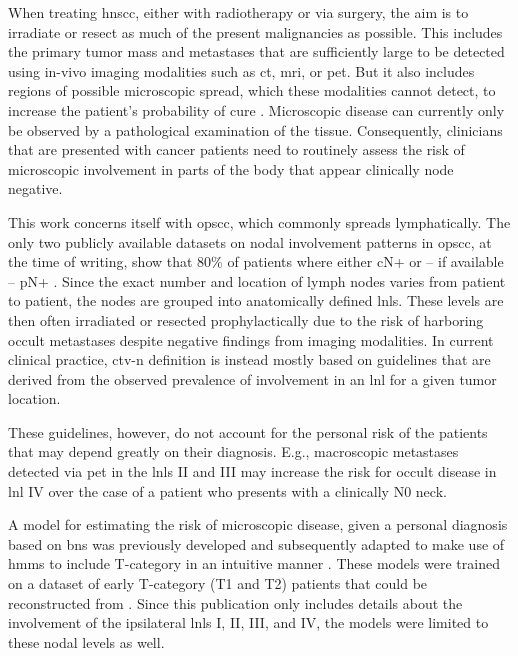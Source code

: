 \documentclass[twocolumn]{aastex631}
\begin{document}
When treating \gls{hnscc}, either with radiotherapy or via surgery, the aim is to irradiate or resect as much of the present malignancies as possible. This includes the primary tumor mass and metastases that are sufficiently large to be detected using in-vivo imaging modalities such as \gls{ct}, \gls{mri}, or \gls{pet}. But it also includes regions of possible microscopic spread, which these modalities cannot detect, to increase the patient's probability of cure \cite{poortmans_internal_2020,murthy_prostate-only_2021}. Microscopic disease can currently only be observed by a pathological examination of the tissue. Consequently, clinicians that are presented with cancer patients need to routinely assess the risk of microscopic involvement in parts of the body that appear clinically node negative.

This work concerns itself with \gls{opscc}, which commonly spreads lymphatically. The only two publicly available datasets on nodal involvement patterns in \gls{opscc}, at the time of writing, show that 80\% of patients where either cN+ or -- if available -- pN+ \cite{ludwig_dataset_2022}. Since the exact number and location of lymph nodes varies from patient to patient, the nodes are grouped into anatomically defined \glspl{lnl}. These levels are then often irradiated or resected prophylactically due to the risk of harboring occult metastases despite negative findings from imaging modalities. In current clinical practice, \gls{ctv-n} definition is instead mostly based on guidelines \cite{gregoire_ct-based_2003,gregoire_delineation_2014,gregoire_delineation_2018,eisbruch_intensity-modulated_2002,biau_selection_2019,chao_determination_2002,vorwerk_guidelines_2011,ferlito_elective_2009} that are derived from the observed prevalence of involvement in an \gls{lnl} for a given tumor location.

These guidelines, however, do not account for the personal risk of the patients that may depend greatly on their diagnosis. E.g., macroscopic metastases detected via \gls{pet} in the \glspl{lnl} II and III may increase the risk for occult disease in \gls{lnl} IV over the case of a patient who presents with a clinically N0 neck.

A model for estimating the risk of microscopic disease, given a personal diagnosis based on \glspl{bn} was previously developed \cite{pouymayou_bayesian_2019} and subsequently adapted to make use of \glspl{hmm} to include T-category in an intuitive manner \cite{ludwig_hidden_2021}. These models were trained on a dataset of early T-category (T1 and T2) patients that could be reconstructed from \cite{sanguineti_defining_2009}. Since this publication only includes details about the involvement of the ipsilateral \glspl{lnl} I, II, III, and IV, the models were limited to these nodal levels as well.
\end{document}
